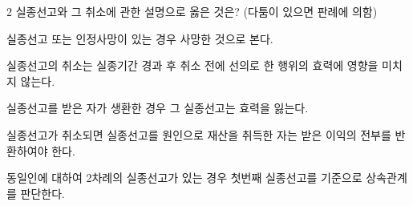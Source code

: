 \begin{question}{2}
실종선고와 그 취소에 관한 설명으로 옳은 것은? (다툼이 있으면 판례에 의함)
\begin{choices}
  \item 실종선고 또는 인정사망이 있는 경우 사망한 것으로 본다.
  \item 실종선고의 취소는 실종기간 경과 후 취소 전에 선의로 한 행위의 효력에 영향을 미치지 않는다.
  \item 실종선고를 받은 자가 생환한 경우 그 실종선고는 효력을 잃는다.
  \item 실종선고가 취소되면 실종선고를 원인으로 재산을 취득한 자는 받은 이익의 전부를 반환하여야 한다.
  \item 동일인에 대하여 2차례의 실종선고가 있는 경우 첫번째 실종선고를 기준으로 상속관계를 판단한다.
\end{choices}
\end{question}
